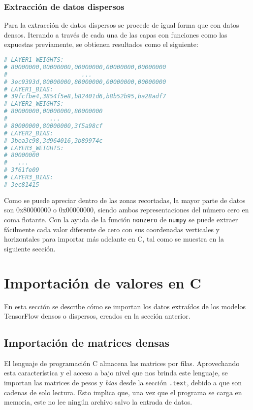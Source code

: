 \subsubsection{Extracción de datos dispersos}
\label{sssec:extraccion_datos_dispersos}
Para la extracción de datos dispersos se procede de igual forma que con datos densos. Iterando a través de cada una de las capas con funciones como las expuestas previamente, se obtienen resultados como el siguiente:\medskip
\begin{lstlisting}[language=Python]
# LAYER1_WEIGHTS:
# 80000000,80000000,00000000,00000000,00000000
#                     ...
# 3ec9393d,80000000,80000000,00000000,00000000
# LAYER1_BIAS:
# 39fcfbe4,3854f5e8,b82401d6,b8b52b95,ba28adf7
# LAYER2_WEIGHTS:
# 80000000,00000000,80000000
#            ...
# 80000000,80000000,3f5a98cf
# LAYER2_BIAS:
# 3bea3c98,3d964016,3b89974c
# LAYER3_WEIGHTS:
# 80000000
#   ...
# 3f61fe09
# LAYER3_BIAS:
# 3ec81415    
\end{lstlisting}

Como se puede apreciar dentro de las zonas recortadas, la mayor parte de datos son 0x80000000 o 0x00000000, siendo ambos representaciones del número cero en coma flotante. Con la ayuda de la función \texttt{nonzero} de \texttt{numpy} se puede extraer fácilmente cada valor diferente de cero con sus coordenadas verticales y horizontales para importar más adelante en C, tal como se muestra en la siguiente sección.

\section{Importación de valores en C}
\label{sec:importacion_valores_c}
En esta sección se describe cómo se importan los datos extraídos de los modelos TensorFlow densos o dispersos, creados en la sección anterior.

\subsection{Importación de matrices densas}
\label{ssec:importacion_matrices_densas}
El lenguaje de programación C almacena las matrices por filas. Aprovechando esta característica y el acceso a bajo nivel que nos brinda este lenguaje, se importan las matrices de pesos y \textit{bias} desde la sección \texttt{.text}, debido a que son cadenas de solo lectura. Esto implica que, una vez que el programa se carga en memoria, este no lee ningún archivo salvo la entrada de datos.

